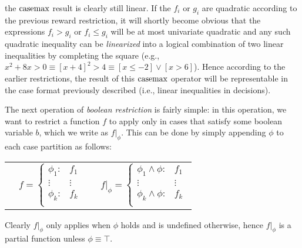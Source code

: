 the $\mathrm{casemax}$ result is clearly still linear.  If the $f_i$ or $g_i$
are quadratic according to the previous reward restriction, it will
shortly become obvious that the expressions $f_i > g_i$ or $f_i \leq
g_i$ will be at most univariate quadratic and any such quadratic
inequality can be \emph{linearized} into a logical combination of two
linear inequalities by completing the square (e.g., $x^2 + 8x > 0
\equiv [x + 4]^2 > 4 \equiv [x \leq -2] \lor [x > 6]$).  Hence
according to the earlier restrictions, the result of this $\mathrm{casemax}$
operator will be representable in the case format previously described
(i.e., linear inequalities in decisions).




The next operation of \emph{boolean restriction} is fairly simple: in this
operation, we want to restrict a function $f$ to apply only in cases
that satisfy some boolean variable $b$, which we write as $f|_{\phi}$.  
This can be done by simply appending $\phi$ to each case partition
as follows:
{\footnotesize
\begin{center}
\begin{tabular}{r c c l}
&
\hspace{-6mm} 
  $f = \begin{cases}
    \phi_1: & f_1 \\ 
   \vdots&\vdots\\ 
    \phi_k: & f_k \\ 
  \end{cases}$
&

&
\hspace{-2mm}
  $f|_{\phi} = \begin{cases}
    \phi_1 \land \phi : & f_1 \\ 
   \vdots&\vdots\\ 
    \phi_k \land \phi : & f_k \\ 
  \end{cases}$
\end{tabular}
\end{center}
}
Clearly $f|_{\phi}$ only applies when $\phi$ holds and is
undefined otherwise, hence $f|_{\phi}$ is a partial function
unless $\phi \equiv \top$.

